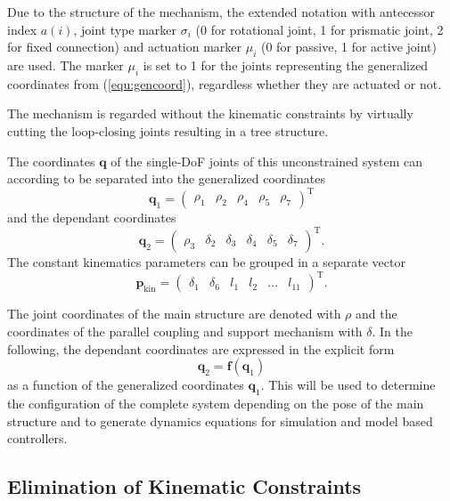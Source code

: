 \documentclass[letterpaper, 10 pt, conference]{ieeeconf}  %
\begin{document}
Due to the structure of the mechanism, the extended notation with antecessor index $a(i)$, joint type marker $\sigma_i$ (0 for rotational joint, 1 for prismatic joint, 2 for fixed connection) and actuation marker $\mu_i$ (0 for passive, 1 for active joint) are used.
The marker $\mu_i$ is set to 1 for the joints representing the generalized coordinates from (\ref{equ:gencoord}), regardless whether they are actuated or not.

The mechanism is regarded without the kinematic constraints by virtually cutting the loop-closing joints resulting in a tree structure.

The coordinates $\bm{q}$ of the single-DoF joints of this unconstrained system can according to \cite{NakamuraGho1989} be separated into the generalized coordinates
%
\begin{equation}
\bm{q}_1=\begin{pmatrix}\rho_1 & \rho_2 & \rho_4 & \rho_5 &\rho_7 \end{pmatrix}^\mathrm{T}
\end{equation}
%
and the dependant coordinates
%
\begin{equation}
\bm{q}_2=\begin{pmatrix}\rho_3 & \delta_2 & \delta_3 & \delta_4 & \delta_5 & \delta_7 \end{pmatrix}^\mathrm{T}.
\label{equ:gencoord}
\end{equation}
%
The constant kinematics parameters can be grouped in a separate vector
%
\begin{equation}
\bm{p}_\mathrm{kin}=\begin{pmatrix}\delta_1 & \delta_6 & l_1 & l_2 & ... & l_{11} \end{pmatrix}^\mathrm{T}.
\label{equ:kinparam}
\end{equation}

The joint coordinates of the main structure are denoted with $\rho$ and the coordinates of the parallel coupling and support mechanism with $\delta$.
%
In the following, the dependant coordinates are expressed in the explicit form
%
\begin{equation}
\bm{q}_2=\bm{f}(\bm{q}_1)
\end{equation}
%
as a function of the generalized coordinates $\bm{q}_1$.
This will be used to determine the configuration of the complete system depending on the pose of the main structure and to generate dynamics equations for simulation and model based controllers.

\subsection{Elimination of Kinematic Constraints}
\end{document}
